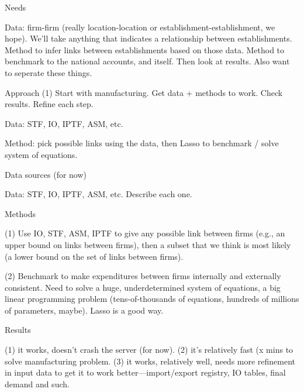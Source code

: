 \documentclass[12pt]{beamer}
\begin{document}
\begin{frame}{Needs}

Data: firm-firm (really location-location or establishment-establishment, we hope). We'll take anything that indicates a relationship between establishments. Method to infer links between establishments based on those data.  Method to benchmark to the national accounts, and itself. Then look at results. Also want to seperate these things. 

\end{frame}

\begin{frame}{Approach}
(1) Start with manufacturing. Get data + methods to work. Check results. Refine each step.  

Data: STF, IO, IPTF, ASM, etc.

Method: pick possible links using the data, then Lasso to benchmark / solve system of equations.

\end{frame}

\begin{frame}{Data sources (for now)}

Data: STF, IO, IPTF, ASM, etc. Describe each one.

\end{frame}

\begin{frame}{Methods}

(1) Use IO, STF, ASM, IPTF to give any possible link between firms (e.g., an upper bound on links between firms), then a subset that we think is most likely (a lower bound on the set of links between firms).

(2) Benchmark to make expenditures between firms internally and externally consistent. Need to solve a huge, underdetermined system of equations, a big linear programming problem (tens-of-thousands of equations, hundreds of millions of parameters, maybe). Lasso is a good way.

\end{frame}

\begin{frame}{Results}

(1) it works, doesn't crash the server (for now).  (2) it's relatively fast (x mins to solve manufacturing problem. (3) it works, relatively well, needs more refinement in input data to get it to work better---import/export registry, IO tables, final demand and such.

\end{frame}

%
%
\end{document}
